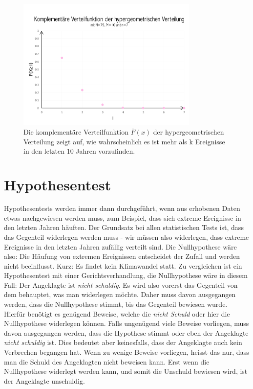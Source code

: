 \begin{refsection}
\begin{figure}
\centering
\includegraphics[width=0.8\textwidth]{extrem/HyperExt.pdf}
\caption{Die komplementäre Verteilfunktion $\bar{F}(x)$ der hypergeometrischen Verteilung zeigt auf, wie wahrscheinlich es ist mehr als k Ereignisse in den letzten 10 Jahren vorzufinden.}
\label{HyperExt}
\end{figure}

\section{Hypothesentest}
Hypothesentests werden immer dann durchgeführt, wenn aus erhobenen Daten etwas nachgewiesen werden muss, zum Beispiel, dass sich extreme Ereignisse in den letzten Jahren häuften. Der Grundsatz bei allen statistischen Tests ist, dass das Gegenteil widerlegen werden muss - wir müssen also widerlegen, dass extreme Ereignisse in den letzten Jahren zufällig verteilt sind. Die Nullhypothese wäre also: Die Häufung von extremen Ereignissen entscheidet der Zufall und werden nicht beeinflusst. Kurz: Es findet kein Klimawandel statt.
Zu vergleichen ist ein Hypothesentest mit einer Gerichtsverhandlung, die Nullhypothese wäre in diesem Fall: Der Angeklagte ist \textit{nicht schuldig}. Es wird also vorerst das Gegenteil von dem behauptet, was man widerlegen möchte. Daher muss davon ausgegangen werden, dass die Nullhypothese stimmt, bis das Gegenteil bewiesen wurde. Hierfür benötigt es genügend Beweise, welche die \textit{nicht Schuld} oder hier die Nullhypothese widerlegen können.
Falls ungenügend viele Beweise vorliegen, muss davon ausgegangen werden, dass die Hypothese stimmt oder eben der Angeklagte \textit{nicht schuldig} ist. Dies bedeutet aber keinesfalls, dass der Angeklagte auch kein Verbrechen begangen hat. Wenn zu wenige Beweise vorliegen, heisst das nur, dass man die Schuld des Angeklagten nicht beweisen kann. Erst wenn die Nullhypothese widerlegt werden kann, und somit die Unschuld bewiesen wird, ist der Angeklagte unschuldig.



\end{refsection}
